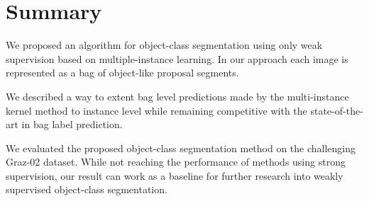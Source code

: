 \section{Summary}

We proposed an algorithm for object-class segmentation using only weak
supervision based on multiple-instance learning. In our approach each image is
represented as a bag of object-like proposal segments.

We described a way to extent bag level predictions made by the multi-instance
kernel method to instance level while remaining competitive with the
state-of-the-art in bag label prediction.

We evaluated the proposed object-class segmentation method on the challenging
Graz-02 dataset. While not reaching the performance of methods using strong
supervision, our result can work as a baseline for further research into weakly
supervised object-class segmentation.
